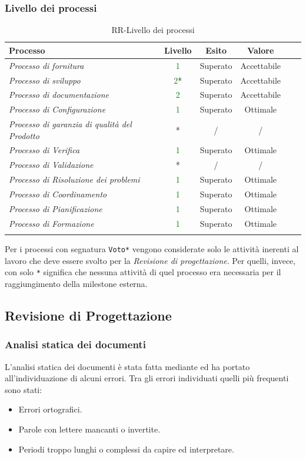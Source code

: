 \subsubsection{Livello dei processi}
\begin{longtable}{|>{\centering}m{6cm}|c|c|c|c|c|}
\hline
\textbf{Processo} & \textbf{Livello} & \textbf{Esito} & \textbf{Valore}\\
\hline
\endhead
\emph{Processo di fornitura} & \textcolor{Green}{1} & Superato & Accettabile\\ \hline
\emph{Processo di sviluppo} & \textcolor{Green}{2}* & Superato & Accettabile\\ \hline
\emph{Processo di documentazione} & \textcolor{Green}{2} & Superato & Accettabile\\ 
\hline
\emph{Processo di Configurazione} & \textcolor{Green}{1} & Superato & Ottimale\\ 
\hline
\emph{Processo di garanzia di qualità del Prodotto} & * & / & /\\ 
\hline
\emph{Processo di Verifica} & \textcolor{Green}{1} & Superato & Ottimale\\ 
\hline
\emph{Processo di Validazione} & * & / & /\\ 
\hline
\emph{Processo di Risoluzione dei problemi} & \textcolor{Green}{1} & Superato & Ottimale\\ 
\hline
\emph{Processo di Coordinamento} & \textcolor{Green}{1} & Superato & Ottimale\\ 
\hline
\emph{Processo di Pianificazione} & \textcolor{Green}{1} & Superato & Ottimale\\ 
\hline
\emph{Processo di Formazione} & \textcolor{Green}{1} & Superato & Ottimale\\ 
\hline
\caption{RR-Livello dei processi}
\end{longtable}

Per i processi con segnatura \texttt{Voto*} vengono considerate solo le attività inerenti al lavoro che deve essere svolto per la \textit{Revisione di progettazione}. Per quelli, invece, con solo \texttt{*} significa che nessuna attività di quel processo era necessaria per il raggiungimento della milestone esterna.

\newpage

\subsection{Revisione di Progettazione}

\subsubsection{Analisi statica dei documenti}
L'analisi statica dei documenti è stata fatta mediante  ed ha portato all'individuazione di alcuni errori. Tra gli errori individuati quelli più frequenti sono stati:
		\begin{itemize}
			\item Errori ortografici.
			\item Parole con lettere mancanti o invertite.
			\item Periodi troppo lunghi o complessi da capire ed interpretare.
		\end{itemize}

